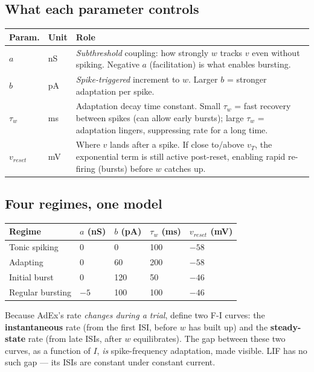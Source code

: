 \documentclass[11pt,a4paper]{article}
\begin{document}
\subsection{What each parameter controls}
\begin{center}
\begin{tabular}{@{}p{1.6cm}p{2.6cm}p{9.5cm}@{}}
\toprule
\textbf{Param.} & \textbf{Unit} & \textbf{Role} \\
\midrule
$a$ & nS & \emph{Subthreshold} coupling: how strongly $w$ tracks $v$ even without spiking. Negative $a$ (facilitation) is what enables bursting. \\
$b$ & pA & \emph{Spike-triggered} increment to $w$. Larger $b$ = stronger adaptation per spike. \\
$\tau_w$ & ms & Adaptation decay time constant. Small $\tau_w$ = fast recovery between spikes (can allow early bursts); large $\tau_w$ = adaptation lingers, suppressing rate for a long time. \\
$v_{reset}$ & mV & Where $v$ lands after a spike. If close to/above $v_T$, the exponential term is still active post-reset, enabling rapid re-firing (bursts) before $w$ catches up. \\
\bottomrule
\end{tabular}
\end{center}

\subsection{Four regimes, one model}
\begin{center}
\begin{tabular}{@{}lllll@{}}
\toprule
\textbf{Regime} & $a$ (nS) & $b$ (pA) & $\tau_w$ (ms) & $v_{reset}$ (mV) \\
\midrule
Tonic spiking & 0 & 0 & 100 & $-58$ \\
Adapting & 0 & 60 & 200 & $-58$ \\
Initial burst & 0 & 120 & 50 & $-46$ \\
Regular bursting & $-5$ & 100 & 100 & $-46$ \\
\bottomrule
\end{tabular}
\end{center}

\begin{keybox}
Because AdEx's rate \emph{changes during a trial}, define two F-I curves: the \textbf{instantaneous} rate (from the first ISI, before $w$ has built up) and the \textbf{steady-state} rate (from late ISIs, after $w$ equilibrates). The gap between these two curves, as a function of $I$, \emph{is} spike-frequency adaptation, made visible. LIF has no such gap — its ISIs are constant under constant current.
\end{keybox}
\end{document}
